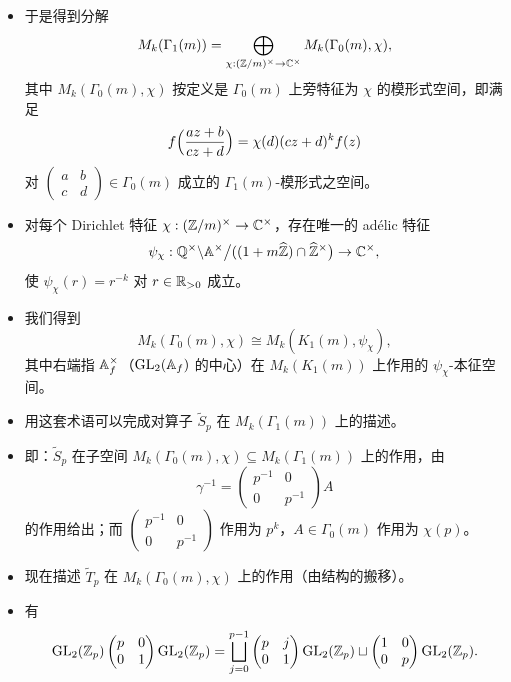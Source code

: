\begin{itemize}
\[\]
\item 于是得到分解
\[
M_k(\Gamma_1(m))=\bigoplus_{\chi:(\mathbb{Z}/m)^\times\to\mathbb{C}^\times}M_k(\Gamma_0(m),\chi),
\]
其中 $M_k(\Gamma_0(m),\chi)$ 按定义是 $\Gamma_0(m)$ 上旁特征为 $\chi$ 的模形式空间，即满足
\[
f\Bigl(\frac{az+b}{cz+d}\Bigr)=\chi(d)(cz+d)^kf(z)
\]
对 $\begin{pmatrix}a&b\\c&d\end{pmatrix}\in\Gamma_0(m)$ 成立的 $\Gamma_1(m)$-模形式之空间。
\item 对每个 Dirichlet 特征 $\chi:(\mathbb{Z}/m)^\times\to\mathbb{C}^\times$，存在唯一的 adélic 特征
\[
\psi_\chi:\mathbb{Q}^\times\backslash\mathbb{A}^\times\bigl/((1+m\widehat{\mathbb{Z}})\cap\widehat{\mathbb{Z}}^\times\bigr)\to\mathbb{C}^\times,
\]
使 $\psi_\chi(r)=r^{-k}$ 对 $r\in\mathbb{R}_{>0}$ 成立。
\item 我们得到
\[
M_k(\Gamma_0(m),\chi)\cong M_k(K_1(m),\psi_\chi),
\]
其中右端指 $\mathbb{A}_f^\times$（$\operatorname{GL}_2(\mathbb{A}_f)$ 的中心）在 $M_k(K_1(m))$ 上作用的 $\psi_\chi$-本征空间。
\item 用这套术语可以完成对算子 $\tilde S_p$ 在 $M_k(\Gamma_1(m))$ 上的描述。
\item 即：$\tilde S_p$ 在子空间 $M_k(\Gamma_0(m),\chi)\subseteq M_k(\Gamma_1(m))$ 上的作用，由
\[
\gamma^{-1}=\begin{pmatrix}p^{-1}&0\\0&p^{-1}\end{pmatrix}A
\]
的作用给出；而 $\begin{pmatrix}p^{-1}&0\\0&p^{-1}\end{pmatrix}$ 作用为 $p^k$，$A\in\Gamma_0(m)$ 作用为 $\chi(p)$。
\item 现在描述 $\tilde T_p$ 在 $M_k(\Gamma_0(m),\chi)$ 上的作用（由结构的搬移）。
\item 有
\[
\operatorname{GL}_2(\mathbb{Z}_p)\begin{pmatrix}p&0\\0&1\end{pmatrix}\operatorname{GL}_2(\mathbb{Z}_p)
=\bigsqcup_{j=0}^{p-1}\begin{pmatrix}p&j\\0&1\end{pmatrix}\operatorname{GL}_2(\mathbb{Z}_p)
\sqcup\begin{pmatrix}1&0\\0&p\end{pmatrix}\operatorname{GL}_2(\mathbb{Z}_p).
\]
\end{itemize}
